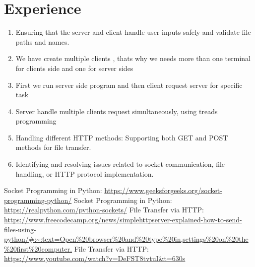 \documentclass[11pt]{article}
\begin{document}
\begin{itemize}
\begin{itemize}
\end{itemize}





\newpage
\section{Experience}
\begin{enumerate}
    \item  Ensuring that the server and client handle user inputs safely and validate file paths and names.
    \item We have create multiple clients , thats why we needs more than one terminal 
     for clients side and one for server sides
    \item First we run server side program and then client request server for specific task
    \item Server handle multiple clients  request simultaneously, using treads programming 
    \item Handling different HTTP methods: Supporting both GET and POST methods for file transfer.
    \item Identifying and resolving issues related to socket communication, file handling, or HTTP protocol implementation.
\end{enumerate}





\begin{thebibliography}{1}
   Socket Programming in Python: \url{https://www.geeksforgeeks.org/socket-programming-python/}
   Socket Programming in Python: \url{https://realpython.com/python-sockets/}
   File Transfer via HTTP: \url{https://www.freecodecamp.org/news/simplehttpserver-explained-how-to-send-files-using-python/#:~:text=Open%20browser%20and%20type%20in,settings%20on%20the%20first%20computer.}
   File Transfer via HTTP: \url{https://www.youtube.com/watch?v=DeFST8tvtuI&t=630s}
\end{thebibliography}
\end{document}
